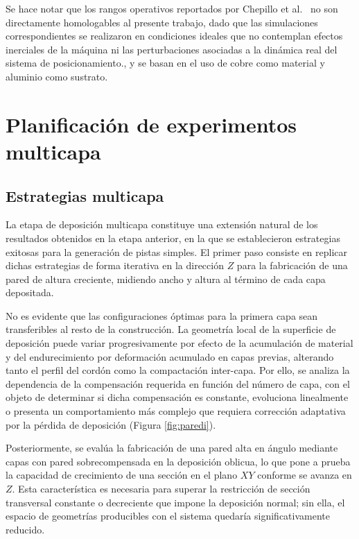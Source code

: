 Se hace notar que los rangos operativos reportados por Chepillo et 
al.~\cite{Chepillo2024} no son directamente homologables al presente 
trabajo, dado que las simulaciones correspondientes se realizaron en 
condiciones ideales que no contemplan efectos inerciales de la máquina ni 
las perturbaciones asociadas a la dinámica real del sistema de 
posicionamiento., y se basan en el uso de cobre como material y aluminio como sustrato.

\section{Planificación de experimentos multicapa}

\subsection{Estrategias multicapa}

La etapa de deposición multicapa constituye una extensión natural de los 
resultados obtenidos en la etapa anterior, en la que se establecieron 
estrategias exitosas para la generación de pistas simples. El primer paso 
consiste en replicar dichas estrategias de forma iterativa en la dirección 
$Z$ para la fabricación de una pared de altura creciente, midiendo ancho y 
altura al término de cada capa depositada.

No es evidente que las configuraciones óptimas para la primera capa sean 
transferibles al resto de la construcción. La geometría local de la 
superficie de deposición puede variar progresivamente por efecto de la 
acumulación de material y del endurecimiento por deformación acumulado en 
capas previas, alterando tanto el perfil del cordón como la compactación 
inter-capa. Por ello, se analiza la dependencia de la compensación 
requerida en función del número de capa, con el objeto de determinar si 
dicha compensación es constante, evoluciona linealmente o presenta un 
comportamiento más complejo que requiera corrección adaptativa por la pérdida de deposición (Figura \ref{fig:paredi}).

Posteriormente, se evalúa la fabricación de una pared alta en ángulo mediante capas con pared sobrecompensada en la deposición oblicua, lo que 
pone a prueba la capacidad de crecimiento de una sección en el plano $XY$ conforme se avanza en $Z$. 
Esta característica es necesaria para superar la restricción de sección 
transversal constante o decreciente que impone la deposición normal; sin 
ella, el espacio de geometrías producibles con el sistema quedaría 
significativamente reducido.

